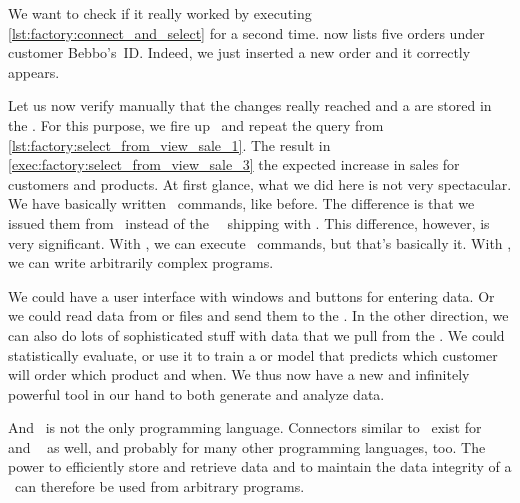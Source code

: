 %
%
%
%
%
We want to check if it really worked by executing \cref{lst:factory:connect_and_select} for a second time.
 now lists five orders under customer Bebbo's~ID.
Indeed, we just inserted a new order and it correctly appears.

Let us now verify manually that the changes really reached and a are stored in the \db.
For this purpose, we fire up \psql\ and repeat the query from \cref{lst:factory:select_from_view_sale_1}.
The result in \cref{exec:factory:select_from_view_sale_3} the expected increase in sales for customers and products.%
%
\endhsection%
\endhsection%
%
%
At first glance, what we did here is not very spectacular.
We have basically written \sql\ commands, like before.
The difference is that we issued them from \python\ instead of the \psql\ \client\ shipping with \postgresql.
This difference, however, is very significant.
With \psql, we can execute \sql\ commands, but that's basically it.
With \python, we can write arbitrarily complex programs.

We could have a user interface with windows and buttons for entering data.
Or we could read data from  or  files and send them to the \dbms.
In the other direction, we can also do lots of sophisticated stuff with data that we pull from the \db.
We could statistically evaluate, or use it to train a  or  model that predicts which customer will order which product and when.
We thus now have a new and infinitely powerful tool in our hand to both generate and analyze data.

And \python\ is not the only programming language.
Connectors similar to \psycopg\ exist for ~\cite{PGDG:PJD} and ~\cite{PGDG:PD:LCL} as well, and probably for many other programming languages, too.
The power to efficiently store and retrieve data and to maintain the data integrity of a \dbms\ can therefore be used from arbitrary programs.%
%
%
%
\FloatBarrier%
\endhsection%
\endhsection%
%
